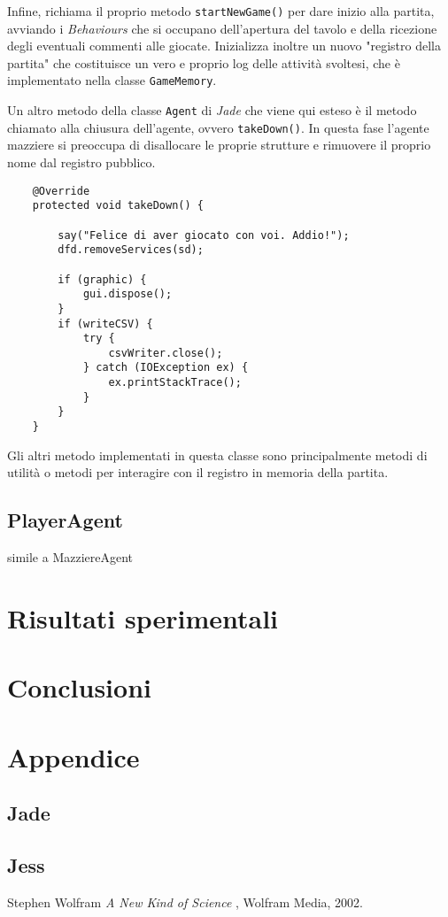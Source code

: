 \documentclass[runningheads,a4paper]{llncs}
\begin{document}
Infine, richiama il proprio metodo \texttt{startNewGame()} per dare inizio alla partita, avviando i \emph{Behaviours} che si occupano dell'apertura del tavolo e della ricezione degli eventuali commenti alle giocate.
Inizializza inoltre un nuovo "registro della partita" che costituisce un vero e proprio log delle attività svoltesi, che è implementato nella classe \texttt{GameMemory}.



Un altro metodo della classe \texttt{Agent} di \emph{Jade} che viene qui esteso è il metodo chiamato alla chiusura dell'agente, ovvero \texttt{takeDown()}.
In questa fase l'agente mazziere si preoccupa di disallocare le proprie strutture e rimuovere il proprio nome dal registro pubblico.
\begin{verbatim}
    @Override
    protected void takeDown() {

        say("Felice di aver giocato con voi. Addio!");
        dfd.removeServices(sd);

        if (graphic) {
            gui.dispose();
        }
        if (writeCSV) {
            try {
                csvWriter.close();
            } catch (IOException ex) {
                ex.printStackTrace();
            }
        }
    }
\end{verbatim}

Gli altri metodo implementati in questa classe sono principalmente metodi di utilità o metodi per interagire con il registro in memoria della partita.


\subsection{PlayerAgent}

simile a MazziereAgent





\section{Risultati sperimentali}

\section{Conclusioni}

\section{Appendice}
\subsection{Jade}
\subsection{Jess}

%
%
\begin{thebibliography}{1}
 Stephen Wolfram \emph{A New Kind of Science
}, Wolfram Media, 2002.
\end{thebibliography}
\end{document}
